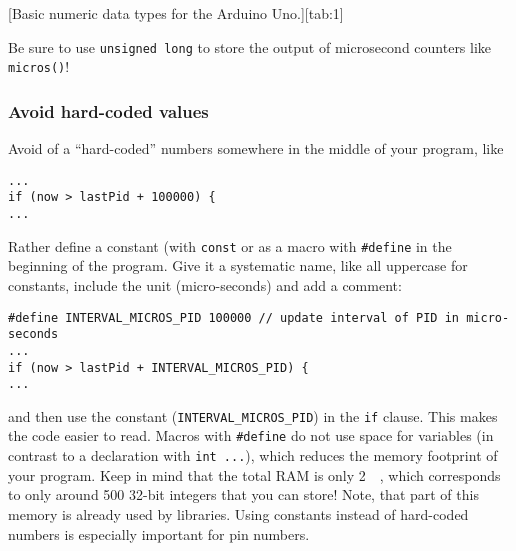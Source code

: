 [Basic numeric data types for the Arduino Uno.][tab:1]
%
\begin{note}[Datatypes]
  Be sure to use \texttt{unsigned long} to store the output of microsecond counters like \texttt{micros()}!
\end{note}
%
\subsubsection{Avoid hard-coded values}
Avoid of a ``hard-coded'' numbers somewhere in the middle of your program, like \eg
%
\begin{verbatim}
...
if (now > lastPid + 100000) {
...
\end{verbatim}
%
Rather define a constant (with \texttt{const} or as a macro with \texttt{#define} in the beginning of the program. Give it a systematic name, like all uppercase for constants, include the unit (\eg micro-seconds) and add a comment: 
%
\begin{verbatim}
#define INTERVAL_MICROS_PID 100000 // update interval of PID in micro-seconds
...
if (now > lastPid + INTERVAL_MICROS_PID) {
...
\end{verbatim}
%
and then use the constant (\texttt{INTERVAL_MICROS_PID}) in the \texttt{if} clause. This makes the code easier to read. Macros with \texttt{#define} do not use space for variables (in contrast to a declaration with \texttt{int ...}), which reduces the memory footprint of your program. Keep in mind that the total RAM is only \SI{2}{\kilo\byte}, which corresponds to only around 500 32-bit integers that you can store! Note, that part of this memory is already used by libraries. Using constants instead of hard-coded numbers is especially important for pin numbers.\par
%

